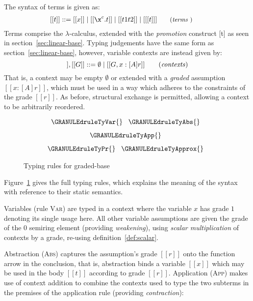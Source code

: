 The syntax of terms is given as:
%
\begin{align*}
\hspace{-0.8em} [[ t ]] ::= \;
       & [[ x ]]
  \mid [[ \x ^ c . t ]]
  \mid [[ t1 t2 ]]
  \mid [[ [t] ]]
{\small{\tag{\textit{terms} }}}
\end{align*}
%
Terms comprise the $\lambda$-calculus, extended
with the \textit{promotion} construct [t] as seen in section~\ref{sec:linear-base}.
Typing judgements have the same form as section~\ref{sec:linear-base}, however, variable contexts 
are instead given by: 
\begin{equation*}
  [[ D ]], [[ G ]] ::= \emptyset
  \mid [[ G , x : [ A ] r ]]
\tag{\textit{contexts}}
\end{equation*}
That is, a context may be empty $\emptyset$ or extended with a \textit{graded}
assumption $ [[ x : [A] r ]]$, which must be used in a
way which adheres to the constraints of the grade $[[ r ]]$. As before, structural
exchange is permitted, allowing a context to be arbitrarily reordered. 


\begin{figure}[H]
\hspace{-0.5em}
\begin{align*}
\hspace{-0.5em}
\begin{array}{c}
\GRANULEdruleTyVar{}
\;\;\;
\GRANULEdruleTyAbs{}
\\[0.75em]
\GRANULEdruleTyApp{}
\\[0.75em]
\GRANULEdruleTyPr{}
\;\;\;
\GRANULEdruleTyApprox{}
\end{array}
\end{align*}
\vspace{-0.5em}
\caption{Typing rules for graded-base}
\label{fig:graded-typing}
\vspace{-0.5em}
 \end{figure}

Figure~\ref{fig:graded-typing} gives the full typing rules, which explains the meaning of
the syntax with reference to their static semantics.

Variables (rule \textsc{Var}) are typed in a context where the variable $x$ has
grade $1$ denoting its single usage here. All other variable assumptions are
given the grade of the $0$ semiring element (providing \emph{weakening}), using
\textit{scalar multiplication} of contexts by a grade, re-using
definition~\eqref{def:scalar}.

Abstraction (\textsc{Abs}) captures the assumption's grade $[[ r ]]$ onto the
function arrow in the conclusion, that is, abstraction binds a variable $[[x]]$
which may be used in the body $[[t]]$ according to grade $[[ r ]]$. Application
(\textsc{App}) makes use of context addition to combine the contexts used to
type the two subterms in the premises of the application rule (providing
\emph{contraction}):

